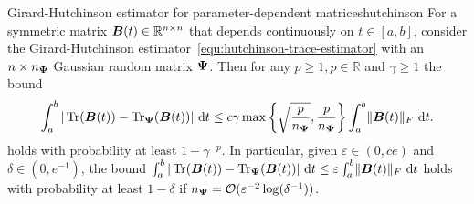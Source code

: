 \begin{theorem}{Girard-Hutchinson estimator for parameter-dependent matrices}{hutchinson}
    For a symmetric matrix $\boldsymbol{B}(t) \in \mathbb{R}^{n \times n}$ that depends continuously on $t \in [a, b]$, consider the  Girard-Hutchinson estimator~\eqref{equ:hutchinson-trace-estimator} with an $n\times n_{\boldsymbol{\Psi}}$ Gaussian random matrix $\boldsymbol{\Psi}$. Then for any $p \geq 1, p \in \mathbb{R}$ and $\gamma \geq 1$ the bound 
    \begin{equation} \label{eq:ghbound}
        \int_{a}^{b} |\operatorname{Tr}(\boldsymbol{B}(t)) - \operatorname{Tr}_{\boldsymbol{\Psi}}(\boldsymbol{B}(t))|~\mathrm{d}t \leq c \gamma \max\left\{ \sqrt{\frac{p}{n_{\boldsymbol{\Psi}}}}, \frac{p}{n_{\boldsymbol{\Psi}}}  \right\} \int_{a}^{b} \lVert \boldsymbol{B}(t) \rVert _F~\mathrm{d}t.
    \end{equation}
    holds with probability at least $1 - \gamma^{-p}$.
    In particular, given $\varepsilon \in (0, ce)$ and $\delta \in (0, e^{-1})$, the bound $\int_{a}^{b} | \operatorname{Tr}(\boldsymbol{B}(t)) - \operatorname{Tr}_{\boldsymbol{\Psi}}(\boldsymbol{B}(t)) | ~\mathrm{d}t \leq \varepsilon \int_{a}^{b} \lVert \boldsymbol{B}(t) \rVert _F~\mathrm{d}t$ holds 
    with probability at least $1-\delta$ if $n_{\boldsymbol{\Psi}} = \mathcal{O}(\varepsilon^{-2} \log(\delta^{-1}))$.
\end{theorem}


